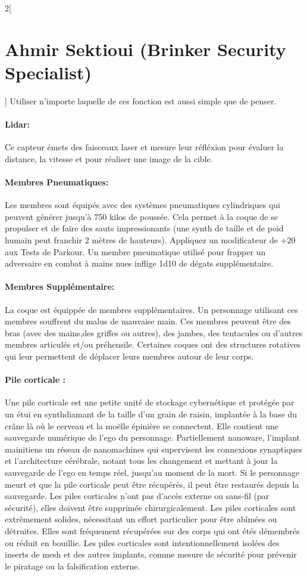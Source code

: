 \documentclass[a4paper,9pt]{article}
\begin{document}
\begin{multicols}{2}[\section*{Ahmir Sektioui (Brinker Security Specialist)}]
   Utiliser n'importe laquelle de ces fonction est aussi simple que de penser.

   \paragraph{Lidar:} Ce capteur émets des faisceaux laser et mesure leur réfléxion
   pour évaluer la distance, la vitesse et pour réaliser une image de la cible.

   \paragraph{Membres Pneumatiques:} Les membres sont équipés avec des systèmes
   pneumatiques cylindriques qui peuvent générer jusqu'à 750 kilos de poussée.
   Cela permet à la coque de se propulser et de faire des sauts impressionants (une
   synth de taille et de poid humain peut franchir 2 mètres de hauteurs).
   Appliquez un modificateur de +20 aux Tests de Parkour. Un membre pneumatique
   utilisé pour frapper un adversaire en combat à mains nues inflige 1d10 de
   dégats supplémentaire.

   \paragraph{Membres Supplémentaire:} La coque est équippée de membres
   supplémentaires. Un personnage utilisant ces membres souffrent du malus de
   mauvaise main. Ces membres peuvent être des bras (avec des mains,des griffes ou
   autres), des jambes, des tentacules ou d'autres membres articulés et/ou
   préhensile. Certaines coques ont des structures rotatives qui leur permettent
   de déplacer leurs membres autour de leur corps.

   \paragraph{Pile corticale :}
   Une pile corticale est une petite unité de stockage cybernétique et protégée
   par un étui en synthdiamant de la taille d'un grain de raisin, implantée à la
   base du crâne là où le cerveau et la moëlle épinière se connectent. Elle
   contient une sauvegarde numérique de l'ego du personnage. Partiellement
   nanoware, l'implant mainitiens un réseau de nanomachines qui supervisent
   les connexions synaptiques et l'architecture cérébrale, notant tous les
   changement et mettant à jour la sauvegarde de l'ego en temps réel, jusqu'au
   moment de la mort. Si le personnage meurt et que la pile corticale peut être
   récupérés, il peut être restaurés depuis la sauvegarde. Les piles corticales
   n'ont pas d'accès externe ou sans-fil (par sécurité), elles doivent être
   supprimée chirurgicalement. Les piles corticales sont extrêmement solides,
   nécessitant un effort particulier pour être abîmées ou détruites. Elles sont
   fréquement récupérées sur des corps qui ont étés démembrés ou réduit en
   bouillie. Les piles corticales sont intentionnellement isolées des inserts de
   mesh et des autres implants, comme mesure de sécurité pour prévenir le piratage
   ou la falsification externe.


\end{multicols}
\end{document}
